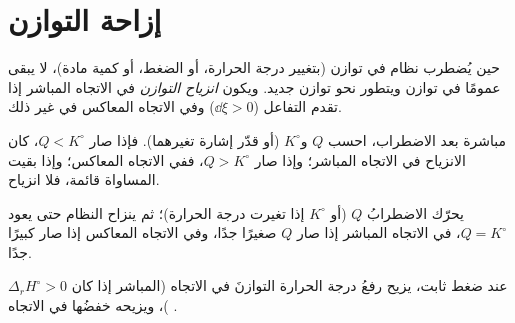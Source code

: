 \section{إزاحة التوازن}

\begin{definition}\label{def:b2:equilibrium-shifts:shift}
حين يُضطرب نظام في توازن (بتغيير درجة الحرارة، أو الضغط، أو كمية
مادة)، لا يبقى عمومًا في توازن ويتطور نحو توازن جديد. ويكون
\emph{انزياح التوازن}
في الاتجاه المباشر إذا تقدم التفاعل ($\dd\xi > 0$) وفي الاتجاه المعاكس
في غير ذلك.
\end{definition}

\begin{method}\label{met:b2:equilibrium-shifts:predict-shift}
مباشرة بعد الاضطراب، احسب $Q$ و$K^\circ$ (أو قدّر إشارة تغيرهما). فإذا صار
$Q < K^\circ$، كان الانزياح في الاتجاه المباشر؛ وإذا صار $Q > K^\circ$،
ففي الاتجاه المعاكس؛ وإذا بقيت المساواة قائمة، فلا انزياح.
\end{method}

\begin{omfigure}

{\small يحرّك الاضطرابُ $Q$ (أو $K^\circ$ إذا تغيرت درجة الحرارة)؛
ثم ينزاح النظام حتى يعود $Q = K^\circ$، في الاتجاه المباشر إذا صار $Q$
صغيرًا جدًا، وفي الاتجاه المعاكس إذا صار كبيرًا جدًا.}
\end{omfigure}

\begin{proposition}\label{prop:b2:equilibrium-shifts:temperature}
عند ضغط ثابت، يزيح رفعُ درجة الحرارة التوازنَ في الاتجاه
 (المباشر إذا كان $\Delta_r H^\circ > 0$)، ويزيحه خفضُها في
الاتجاه .
\end{proposition}

